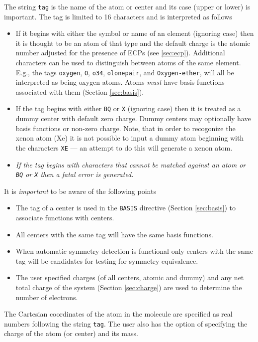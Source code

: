 The string \verb+tag+ is the name of the atom or center and its case
(upper or lower) is important.  The tag is limited to 16 characters
and is interpreted as follows
\begin{itemize}
\item If it begins with either the symbol or name of an element
      (ignoring case) then it is thought to be an atom of that type
      and the default charge is the atomic number adjusted for the
      presence of ECPs (see \ref{sec:ecp}).  Additional characters can
      be used to distinguish between atoms of the same element. E.g.,
      the tags \verb+oxygen+, \verb+O+, \verb+o34+, \verb+olonepair+,
      and \verb+Oxygen-ether+, will all be interpreted as being oxygen
      atoms.  Atoms {\em must} have basis functions associated with
      them (Section \ref{sec:basis}). 
    \item If the tag begins with either \verb+BQ+ or \verb+X+
      (ignoring case) then it is treated as a dummy center with
      default zero charge. Dummy centers may optionally have basis
      functions or non-zero charge.  Note, that in order to recogonize
      the xenon atom (Xe) it is not possible to input a dummy atom 
      beginning with the characters \verb+XE+ --- an attempt to do
      this will generate a xenon atom.
    \item {\em If the tag begins with characters that cannot be
        matched against an atom or \verb+BQ+ or \verb+X+ then a fatal
        error is generated.}
\end{itemize}

It is {\em important} to be aware of the following points
\begin{itemize}
\item The tag of a center is used in the \verb+BASIS+ directive (Section
\ref{sec:basis}) to associate functions with centers.  
\item All centers with the same tag will have the same basis
functions.
\item When automatic symmetry detection is functional only centers
with the same tag will be candidates for testing for symmetry
equivalence.
\item The user specified charges (of all centers, atomic and dummy)
and any net total charge of the system (Section \ref{sec:charge}) are
used to determine the number of electrons.
\end{itemize}

The Cartesian coordinates of the atom in the molecule are specified as real
numbers following the string \verb+tag+.  The user also has the option
of specifying the charge of the atom (or center) and its mass.

